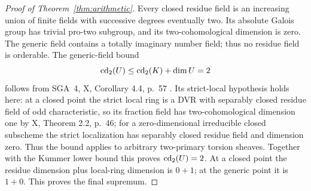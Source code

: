 \begin{proof}[Proof of Theorem~\ref{thm:arithmetic}]
Every closed residue field is an increasing union of finite fields
with successive degrees eventually two. Its absolute Galois group
has trivial pro-two subgroup, and its two-cohomological dimension
is zero. The generic field contains a totally imaginary number
field; thus no residue field is orderable. The generic-field bound
\[
 \operatorname{cd}_2(U)\le\operatorname{cd}_2(K)+\dim U=2
\]
follows from SGA~4, X, Corollary 4.4, p.~57 \cite{SGA4}.
Its strict-local hypothesis holds here: at a closed point the
strict local ring is a DVR with separably closed residue field
of odd characteristic, so its fraction field has two-cohomological
dimension one by X, Theorem 2.2, p.~46; for a zero-dimensional
irreducible closed subscheme the strict localization has
separably closed residue field and dimension zero. Thus the bound
applies to arbitrary two-primary torsion sheaves. Together with
the Kummer lower bound this proves $\operatorname{cd}_2(U)=2$. At a closed
point the residue dimension plus local-ring dimension is $0+1$;
at the generic point it is $1+0$. This proves the final supremum.
\end{proof}
